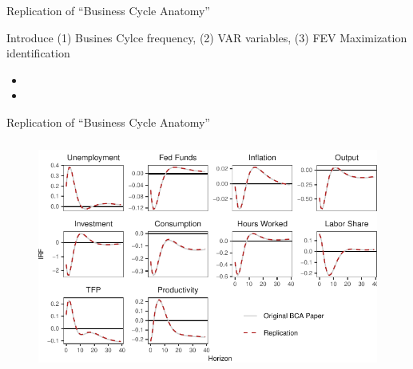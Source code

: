 \begin{frame}{Replication of ``Business Cycle Anatomy''}
    
    \label{replication-slide}

    Introduce (1) Busines Cylce frequency, (2) VAR variables, (3) FEV Maximization identification

    \begin{itemize}
        \item 
    
        \item
    
    \end{itemize}

\end{frame}


\begin{frame}{Replication of ``Business Cycle Anatomy''}

    \begin{figure}
        \includegraphics[height = 3in]{figs/fig1_bca_replication.pdf}
    \end{figure}

\end{frame}
